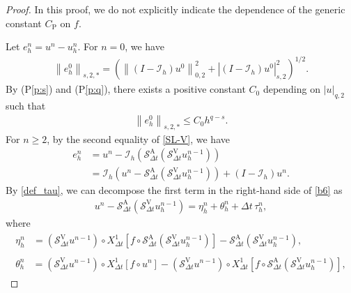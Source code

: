 \documentclass[10pt,a4paper]{amsart}
\def\norm#1#2{\left\|#2\right\|_{#1}}
\def\snorm#1#2{\left|#2\right|_{#1}}
\begin{document}
\begin{proof} 
  In this proof, we do not explicitly indicate the dependence of the generic constant $C_{\mathrm{P}}$ on $f$. 

  Let $ e_h^n = u^n - u_h^n $. For $ n = 0 $, we have 
  \begin{align}
    \norm{s, 2, \ast}{e_h^0} = \left(\norm{0, 2}{(I - \mathcal{I}_{h}) u^0}^2 + \snorm{s, 2}{(I - \mathcal{I}_{h}) u^0}^2\right)^{1/2}. 
  \end{align}
  By (P\ref{p:s}) and (P\ref{p:q}), there exists a positive constant $ C_0 $ depending on $ \snorm{q, 2}{u} $ such that 
  \begin{align} 
    \norm{s, 2, \ast}{e_h^0} \leq C_0 h^{q - s}. 
    \label{b0}
  \end{align}
  For $ n \geq 2 $, by the second equality of \eqref{SL-V}, we have 
  \begin{align} 
    e_h^n 
    & = u^n - \mathcal{I}_{h} (\mathcal{S}_{\Delta t}^{\mathrm{A}} (\mathcal{S}_{\Delta t}^{\mathrm{V}} u_h^{n - 1})) \\
    & = \mathcal{I}_{h} (u^n - \mathcal{S}_{\Delta t}^{\mathrm{A}} (\mathcal{S}_{\Delta t}^{\mathrm{V}} u_h^{n - 1})) + (I - \mathcal{I}_{h}) u^n. 
    \label{b6}
  \end{align} 
  By \eqref{def_tau}, we can decompose the first term in the right-hand side of \eqref{b6} as 
  \begin{align}
    u^n - \mathcal{S}_{\Delta t}^{\mathrm{A}} (\mathcal{S}_{\Delta t}^{\mathrm{V}} u_h^{n - 1}) = \eta_h^n + \theta_h^n + \Delta t \, \tau_h^n, \label{b9} 
  \end{align} 
  where 
  \begin{gather}
    \begin{aligned}
      \eta_h^n & = (\mathcal{S}_{\Delta t}^{\mathrm{V}} u^{n - 1}) \circ {X_{\Delta t}^1} [f \circ \mathcal{S}_{\Delta t}^{\mathrm{A}} (\mathcal{S}_{\Delta t}^{\mathrm{V}} u_h^{n - 1})] - \mathcal{S}_{\Delta t}^{\mathrm{A}} (\mathcal{S}_{\Delta t}^{\mathrm{V}} u_h^{n - 1}), 
    \end{aligned} \\ 
    \begin{aligned} 
      \theta_h^n & = (\mathcal{S}_{\Delta t}^{\mathrm{V}} u^{n - 1}) \circ {X_{\Delta t}^1} [f \circ u^n] - (\mathcal{S}_{\Delta t}^{\mathrm{V}} u^{n - 1}) \circ {X_{\Delta t}^1} [f \circ \mathcal{S}_{\Delta t}^{\mathrm{A}} (\mathcal{S}_{\Delta t}^{\mathrm{V}} u_h^{n - 1})], \label{b9-3} 
    \end{aligned} 
  \end{gather} 

\end{proof}
\end{document}
